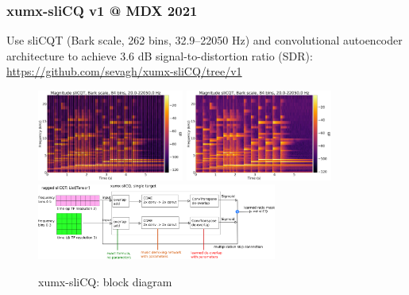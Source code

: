 \documentclass[usenames,dvipsnames]{beamer}
\begin{document}
\begin{frame}
	\frametitle{xumx-sliCQ v1 @ MDX 2021}
        Use sliCQT (Bark scale, 262 bins, 32.9--22050 Hz) and convolutional autoencoder architecture to achieve 3.6 dB signal-to-distortion ratio (SDR): \url{https://github.com/sevagh/xumx-sliCQ/tree/v1}
	\begin{figure}[ht]
		\centering
		\includegraphics[height=3cm]{./images/gspi_overlap_flatten.png}
		\includegraphics[height=3cm]{./images/gspi_overlap_proper.png}
		\includegraphics[height=2.5cm]{./images/xumx_slicq_pertarget.png}
		\vspace{-0.5em}
		\caption{xumx-sliCQ: block diagram}
		\vspace{-0.5em}
	\end{figure}
\end{frame}
\end{document}
